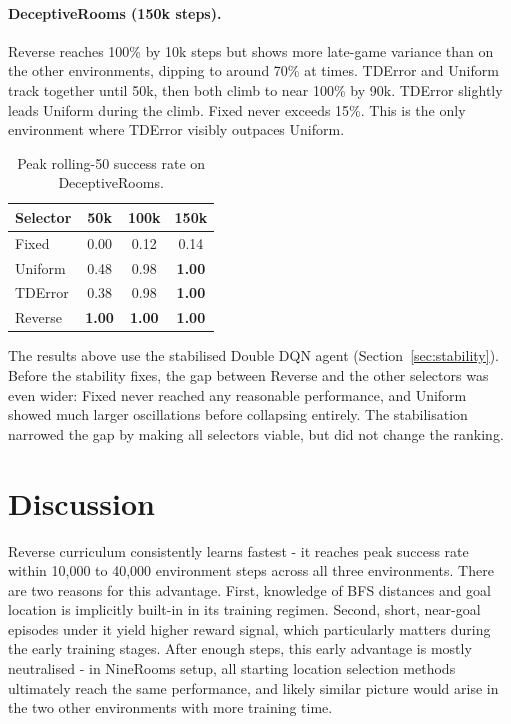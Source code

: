 \documentclass{article}
\begin{document}
\paragraph{DeceptiveRooms (150k steps).}
Reverse reaches 100\% by 10k steps but shows more late-game variance than on the other environments, dipping to around 70\% at times. TDError and Uniform track together until 50k, then both climb to near 100\% by 90k. TDError slightly leads Uniform during the climb. Fixed never exceeds 15\%. This is the only environment where TDError visibly outpaces Uniform.

\begin{table}[h]
\caption{Peak rolling-50 success rate on DeceptiveRooms.}
\label{tab:deceptiverooms}
\centering
\begin{tabular}{lccc}
\toprule
Selector & 50k & 100k & 150k \\
\midrule
Fixed    & 0.00 & 0.12 & 0.14 \\
Uniform  & 0.48 & 0.98 & \textbf{1.00} \\
TDError  & 0.38 & 0.98 & \textbf{1.00} \\
Reverse  & \textbf{1.00} & \textbf{1.00} & \textbf{1.00} \\
\bottomrule
\end{tabular}
\end{table}

The results above use the stabilised Double DQN agent
(Section~\ref{sec:stability}). Before the stability fixes, the gap between Reverse and the other selectors was even wider: Fixed never reached any reasonable performance, and Uniform showed much larger oscillations before collapsing entirely. The stabilisation narrowed the gap by making all selectors viable, but did not change the ranking.

\section{Discussion}
\label{sec:discussion}

Reverse curriculum consistently learns fastest - it reaches peak success rate within 10,000 to 40,000 environment steps across all three environments. There are two reasons for this advantage. First, knowledge of BFS distances and goal location is implicitly built-in in its training regimen. Second, short, near-goal episodes under it yield higher reward signal, which particularly matters during the early training stages. After enough steps, this early advantage is mostly neutralised - in NineRooms setup, all starting location selection methods ultimately reach the same performance, and likely similar picture would arise in the two other environments with more training time.
\end{document}
